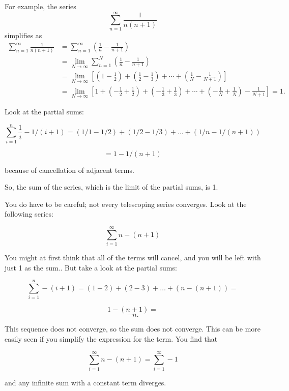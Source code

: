 \documentclass{article}
\begin{document}

	
	\large
For example, the series
\[\sum_{n=1}^\infty\frac{1}{n(n+1)}\]
simplifies as
\begin{align}
	\sum_{n=1}^\infty \frac{1}{n(n+1)} & {} = \sum_{n=1}^\infty \left( \frac{1}{n} - \frac{1}{n+1} \right) \\
	{} & {} = \lim_{N\to\infty} \sum_{n=1}^N \left( \frac{1}{n} - \frac{1}{n+1} \right) \\
	{} & {} = \lim_{N\to\infty} \left\lbrack {\left(1 - \frac{1}{2}\right) + \left(\frac{1}{2} - \frac{1}{3}\right) + \cdots + \left(\frac{1}{N} - \frac{1}{N+1}\right) } \right\rbrack  \\
	{} & {} = \lim_{N\to\infty} \left\lbrack {  1 + \left( - \frac{1}{2} + \frac{1}{2}\right) + \left( - \frac{1}{3} + \frac{1}{3}\right) + \cdots + \left( - \frac{1}{N} + \frac{1}{N}\right) - \frac{1}{N+1} } \right\rbrack = 1.
\end{align}


	
	\Large
		
	
	
	
	Look at the partial sums:


\[   \sum^{n}_{i=1}  \frac{1}{i}  - 1/(i+1) = (1/1 - 1/2) + (1/2 - 1/3) + \ldots + (1/n - 1/(n+1))\]

\[= 1 - 1/(n+1)\]

because of cancellation of adjacent terms. 

So, the sum of the series, which is the limit of the partial sums, is 1.



\Large
You do have to be careful; not every telescoping series converges. Look at the following series:

\[   \sum^{\infty}_{i=1} n - (n + 1) \]

You might at first think that all of the terms will cancel, and you will be left with just 1 as the sum.. But take a look at the partial sums:

\[   \sum^{n}_{i=1} - (i + 1) = (1 - 2) + (2 - 3) + \ldots + (n - (n + 1)) =\]

\[1 - (n + 1) =\]
\[-n.\]



	
	\Large
This sequence does not converge, so the sum does not converge. This can be more easily seen if you simplify the expression for the term. You find that

\[   \sum^{\infty}_{i=1} n - (n + 1) = \sum^{\infty}_{i=1} -1 \]

and any infinite sum with a constant term diverges.
	
\end{document}
